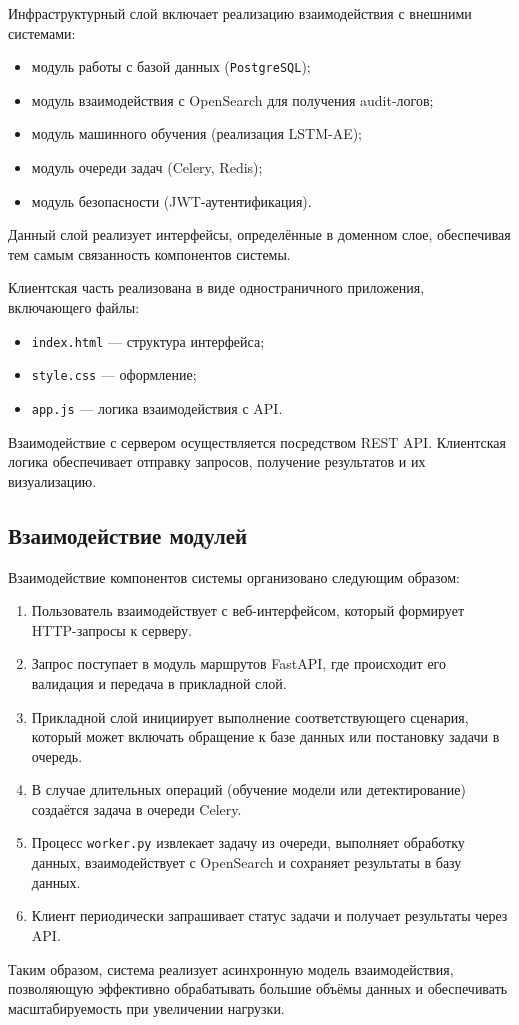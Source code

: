 Инфраструктурный слой включает реализацию взаимодействия с внешними системами:

\begin{itemize}
    \item модуль работы с базой данных (\texttt{PostgreSQL});
    \item модуль взаимодействия с OpenSearch для получения audit-логов;
    \item модуль машинного обучения (реализация LSTM-AE);
    \item модуль очереди задач (Celery, Redis);
    \item модуль безопасности (JWT-аутентификация).
\end{itemize}

Данный слой реализует интерфейсы, определённые в доменном слое, обеспечивая тем самым связанность компонентов системы.

Клиентская часть реализована в виде одностраничного приложения, включающего файлы:

\begin{itemize}
    \item \texttt{index.html} — структура интерфейса;
    \item \texttt{style.css} — оформление;
    \item \texttt{app.js} — логика взаимодействия с API.
\end{itemize}

Взаимодействие с сервером осуществляется посредством REST API. Клиентская логика обеспечивает отправку запросов, получение результатов и их визуализацию.

\subsection{Взаимодействие модулей}

Взаимодействие компонентов системы организовано следующим образом:

\begin{enumerate}
    \item Пользователь взаимодействует с веб-интерфейсом, который формирует HTTP-запросы к серверу.
    \item Запрос поступает в модуль маршрутов FastAPI, где происходит его валидация и передача в прикладной слой.
    \item Прикладной слой инициирует выполнение соответствующего сценария, который может включать обращение к базе данных или постановку задачи в очередь.
    \item В случае длительных операций (обучение модели или детектирование) создаётся задача в очереди Celery.
    \item Процесс \texttt{worker.py} извлекает задачу из очереди, выполняет обработку данных, взаимодействует с OpenSearch и сохраняет результаты в базу данных.
    \item Клиент периодически запрашивает статус задачи и получает результаты через API.
\end{enumerate}

Таким образом, система реализует асинхронную модель взаимодействия, позволяющую эффективно обрабатывать большие объёмы данных и обеспечивать масштабируемость при увеличении нагрузки.